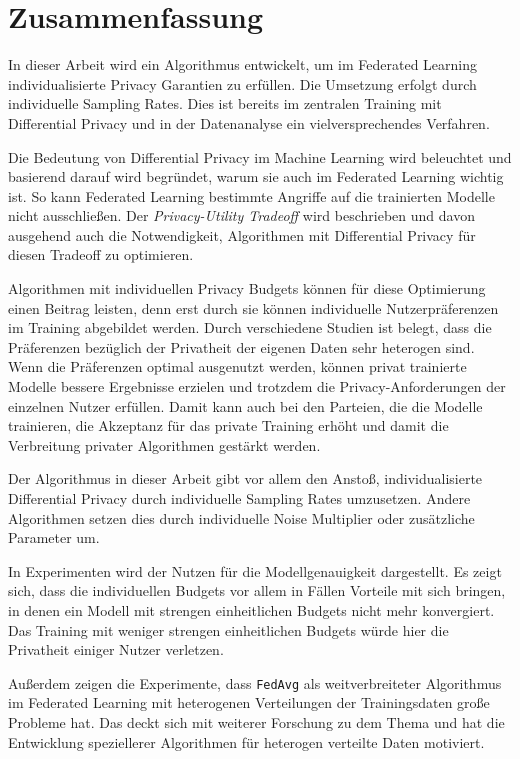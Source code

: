 \chapter{Zusammenfassung}

In dieser Arbeit wird ein Algorithmus entwickelt, um im Federated Learning individualisierte Privacy Garantien zu erfüllen. Die Umsetzung erfolgt durch individuelle Sampling Rates. Dies ist bereits im zentralen Training mit Differential Privacy und in der Datenanalyse ein vielversprechendes Verfahren.

Die Bedeutung von Differential Privacy im Machine Learning wird beleuchtet und basierend darauf wird begründet, warum sie auch im Federated Learning wichtig ist. So kann Federated Learning bestimmte Angriffe auf die trainierten Modelle nicht ausschließen. Der \textit{Privacy-Utility Tradeoff} wird beschrieben und davon ausgehend auch die Notwendigkeit, Algorithmen mit Differential Privacy für diesen Tradeoff zu optimieren. 

Algorithmen mit individuellen Privacy Budgets können für diese Optimierung einen Beitrag leisten, denn erst durch sie können individuelle Nutzerpräferenzen im Training abgebildet werden. Durch verschiedene Studien ist belegt, dass die Präferenzen bezüglich der Privatheit der eigenen Daten sehr heterogen sind. Wenn die Präferenzen optimal ausgenutzt werden, können privat trainierte Modelle bessere Ergebnisse erzielen und trotzdem die Privacy-Anforderungen der einzelnen Nutzer erfüllen. Damit kann auch bei den Parteien, die die Modelle trainieren, die Akzeptanz für das private Training erhöht und damit die Verbreitung privater Algorithmen gestärkt werden.

Der Algorithmus in dieser Arbeit gibt vor allem den Anstoß, individualisierte Differential Privacy durch individuelle Sampling Rates umzusetzen. Andere Algorithmen setzen dies durch individuelle Noise Multiplier oder zusätzliche Parameter um.

In Experimenten wird der Nutzen für die Modellgenauigkeit dargestellt. Es zeigt sich, dass die individuellen Budgets vor allem in Fällen Vorteile mit sich bringen, in denen ein Modell mit strengen einheitlichen Budgets nicht mehr konvergiert. Das Training mit weniger strengen einheitlichen Budgets würde hier die Privatheit einiger Nutzer verletzen.

Außerdem zeigen die Experimente, dass \texttt{FedAvg} als weitverbreiteter Algorithmus im Federated Learning mit heterogenen Verteilungen der Trainingsdaten große Probleme hat. Das deckt sich mit weiterer Forschung zu dem Thema und hat die Entwicklung speziellerer Algorithmen für heterogen verteilte Daten motiviert.

